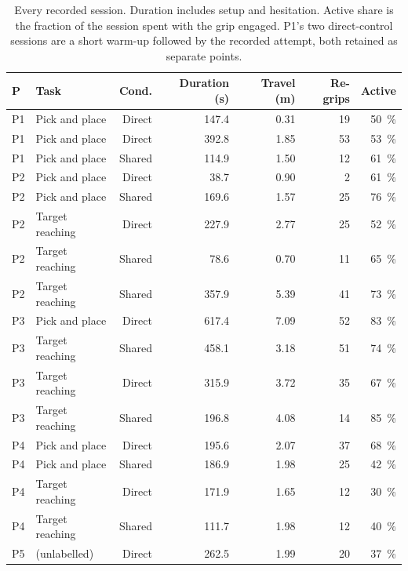 \begin{table}[htbp]
  \centering
  \scriptsize
  \caption[Every pilot session]{Every recorded session. Duration includes
  setup and hesitation. Active share is the fraction of the session spent
  with the grip engaged. P1's two direct-control sessions are a short
  warm-up followed by the recorded attempt, both retained as separate
  points.}
  \label{tab:pilot-sessions}
  \begin{tabular}{@{}llrrrrr@{}}
    \toprule
    P & Task & Cond. & Duration (s) & Travel (m) & Re-grips & Active \\
    \midrule
    P1 & Pick and place   & Direct & 147.4 & 0.31 & 19 & \SI{50}{\percent} \\
    P1 & Pick and place   & Direct & 392.8 & 1.85 & 53 & \SI{53}{\percent} \\
    P1 & Pick and place   & Shared & 114.9 & 1.50 & 12 & \SI{61}{\percent} \\
    P2 & Pick and place   & Direct & 38.7  & 0.90 & 2  & \SI{61}{\percent} \\
    P2 & Pick and place   & Shared & 169.6 & 1.57 & 25 & \SI{76}{\percent} \\
    P2 & Target reaching  & Direct & 227.9 & 2.77 & 25 & \SI{52}{\percent} \\
    P2 & Target reaching  & Shared & 78.6  & 0.70 & 11 & \SI{65}{\percent} \\
    P2 & Target reaching  & Shared & 357.9 & 5.39 & 41 & \SI{73}{\percent} \\
    P3 & Pick and place   & Direct & 617.4 & 7.09 & 52 & \SI{83}{\percent} \\
    P3 & Target reaching  & Shared & 458.1 & 3.18 & 51 & \SI{74}{\percent} \\
    P3 & Target reaching  & Direct & 315.9 & 3.72 & 35 & \SI{67}{\percent} \\
    P3 & Target reaching  & Shared & 196.8 & 4.08 & 14 & \SI{85}{\percent} \\
    P4 & Pick and place   & Direct & 195.6 & 2.07 & 37 & \SI{68}{\percent} \\
    P4 & Pick and place   & Shared & 186.9 & 1.98 & 25 & \SI{42}{\percent} \\
    P4 & Target reaching  & Direct & 171.9 & 1.65 & 12 & \SI{30}{\percent} \\
    P4 & Target reaching  & Shared & 111.7 & 1.98 & 12 & \SI{40}{\percent} \\
    P5 & (unlabelled) & Direct & 262.5 & 1.99 & 20 & \SI{37}{\percent} \\

\end{tabular}
\end{table}
